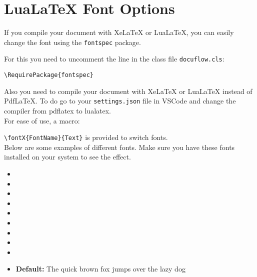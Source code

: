 
\section*{LuaLaTeX Font Options}

If you compile your document with XeLaTeX or LuaLaTeX, you can easily change the font using the \texttt{fontspec} package.

For this you need to uncomment the line in the class file \texttt{docuflow.cls}:
\begin{verbatim}
\RequirePackage{fontspec}
\end{verbatim}

Also you need to compile your document with XeLaTeX or LuaLaTeX instead of PdfLaTeX.
To do go to your \texttt{settings.json} file in VSCode and change the compiler from pdflatex to lualatex.\\

For ease of use, a macro:

\texttt{\textbackslash fontX\{FontName\}\{Text\}} is provided to switch fonts.\\

Below are some examples of different fonts. Make sure you have these fonts installed on your system to see the effect.\\

\begin{itemize}[noitemsep]
    \item {}
    \item {}
    \item {}
    \item {}
    \item {}
    \item {}
    \item {}
    \item {}
    \item {}
    \item \textbf{Default:} \qquad The quick brown fox jumps over the lazy dog
\end{itemize}
